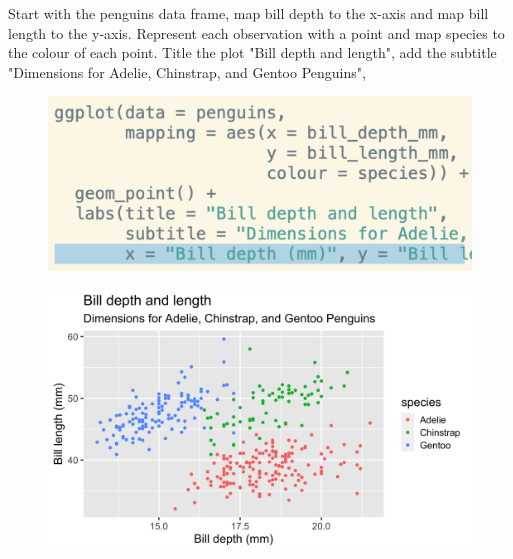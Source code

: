 \documentclass[11pt]{beamer}
\begin{document}
	\begin{frame}
	
	\small{Start with the penguins data frame, map bill depth to the x-axis and map bill length to the y-axis. Represent each observation with a point and map species to the colour of each point. Title the plot "Bill depth and length", add the subtitle "Dimensions for Adelie, Chinstrap, and Gentoo Penguins", }
	
	\begin{minipage}[t]{0.5\linewidth}
		\begin{figure}
			\centering
			\includegraphics[width=1\linewidth]{Images/S2/code/s13}
			
		\end{figure}
	\end{minipage}%
	\begin{minipage}[t]{0.5\linewidth}
		
		\begin{figure}
			\centering
			\includegraphics[width=1\linewidth]{Images/S2/penguins-7-1}
			
		\end{figure}
		
		
	\end{minipage}
	
\end{frame}
\end{document}
